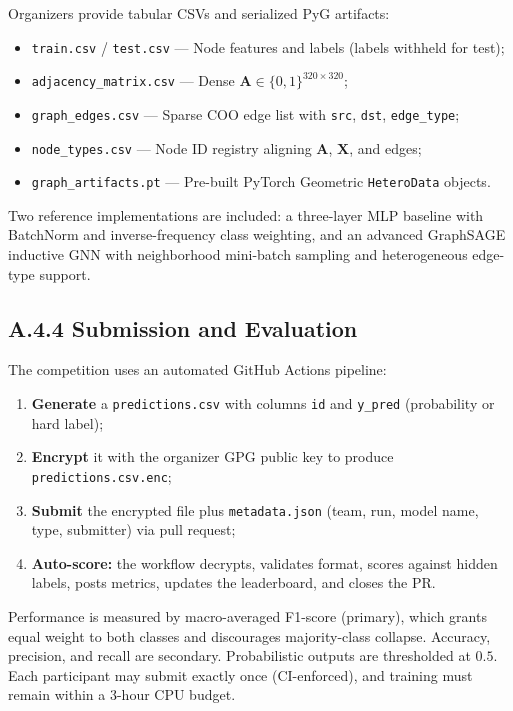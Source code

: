 \documentclass[11pt,a4paper]{article}
\begin{document}
Organizers provide tabular CSVs and serialized PyG artifacts:
\begin{itemize}
    \item \texttt{train.csv} / \texttt{test.csv} --- Node features and labels (labels withheld for test);
    \item \texttt{adjacency\_matrix.csv} --- Dense $\mathbf{A} \in \{0,1\}^{320 \times 320}$;
    \item \texttt{graph\_edges.csv} --- Sparse COO edge list with \texttt{src}, \texttt{dst}, \texttt{edge\_type};
    \item \texttt{node\_types.csv} --- Node ID registry aligning $\mathbf{A}$, $\mathbf{X}$, and edges;
    \item \texttt{graph\_artifacts.pt} --- Pre-built PyTorch Geometric \texttt{HeteroData} objects.
\end{itemize}
Two reference implementations are included: a three-layer MLP baseline with BatchNorm and inverse-frequency class weighting, and an advanced GraphSAGE inductive GNN with neighborhood mini-batch sampling and heterogeneous edge-type support.

\subsection*{A.4.4 Submission and Evaluation}

The competition uses an automated GitHub Actions pipeline:
\begin{enumerate}
    \item \textbf{Generate} a \texttt{predictions.csv} with columns \texttt{id} and \texttt{y\_pred} (probability or hard label);
    \item \textbf{Encrypt} it with the organizer GPG public key to produce \texttt{predictions.csv.enc};
    \item \textbf{Submit} the encrypted file plus \texttt{metadata.json} (team, run, model name, type, submitter) via pull request;
    \item \textbf{Auto-score:} the workflow decrypts, validates format, scores against hidden labels, posts metrics, updates the leaderboard, and closes the PR.
\end{enumerate}

Performance is measured by macro-averaged F1-score (primary), which grants equal weight to both classes and discourages majority-class collapse. Accuracy, precision, and recall are secondary. Probabilistic outputs are thresholded at $0.5$. Each participant may submit exactly once (CI-enforced), and training must remain within a 3-hour CPU budget.
\end{document}
